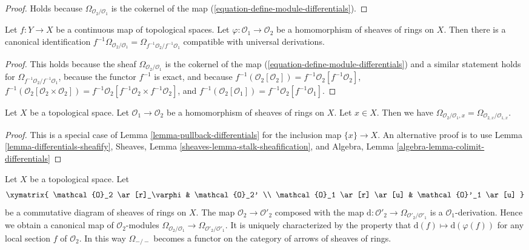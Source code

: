 \begin{proof}
Holds because $\Omega_{\mathcal{O}_2/\mathcal{O}_1}$
is the cokernel of the map (\ref{equation-define-module-differentials}).
\end{proof}

\begin{lemma}
\label{lemma-pullback-differentials}
Let $f : Y \to X$ be a continuous map of topological spaces.
Let $\varphi : \mathcal{O}_1 \to \mathcal{O}_2$
be a homomorphism of sheaves of rings on $X$.
Then there is a canonical identification
$f^{-1}\Omega_{\mathcal{O}_2/\mathcal{O}_1} =
\Omega_{f^{-1}\mathcal{O}_2/f^{-1}\mathcal{O}_1}$
compatible with universal derivations.
\end{lemma}

\begin{proof}
This holds because the sheaf $\Omega_{\mathcal{O}_2/\mathcal{O}_1}$
is the cokernel of the map (\ref{equation-define-module-differentials})
and a similar statement holds for
$\Omega_{f^{-1}\mathcal{O}_2/f^{-1}\mathcal{O}_1}$,
because the functor $f^{-1}$ is exact, and because
$f^{-1}(\mathcal{O}_2[\mathcal{O}_2]) =
f^{-1}\mathcal{O}_2[f^{-1}\mathcal{O}_2]$,
$f^{-1}(\mathcal{O}_2[\mathcal{O}_2 \times \mathcal{O}_2]) =
f^{-1}\mathcal{O}_2[f^{-1}\mathcal{O}_2 \times f^{-1}\mathcal{O}_2]$, and
$f^{-1}(\mathcal{O}_2[\mathcal{O}_1]) =
f^{-1}\mathcal{O}_2[f^{-1}\mathcal{O}_1]$.
\end{proof}

\begin{lemma}
\label{lemma-stalk-module-differentials}
Let $X$ be a topological space. Let $\mathcal{O}_1 \to \mathcal{O}_2$
be a homomorphism of sheaves of rings on $X$. Let $x \in X$. Then we have
$\Omega_{\mathcal{O}_2/\mathcal{O}_1, x} =
\Omega_{\mathcal{O}_{2, x}/\mathcal{O}_{1, x}}$.
\end{lemma}

\begin{proof}
This is a special case of Lemma \ref{lemma-pullback-differentials}
for the inclusion map $\{x\} \to X$. An alternative proof is to use
Lemma \ref{lemma-differentials-sheafify},
Sheaves, Lemma \ref{sheaves-lemma-stalk-sheafification}, and
Algebra, Lemma \ref{algebra-lemma-colimit-differentials}
\end{proof}

\begin{lemma}
\label{lemma-functoriality-differentials}
Let $X$ be a topological space. Let
$$
\xymatrix{
\mathcal{O}_2 \ar[r]_\varphi & \mathcal{O}_2' \\
\mathcal{O}_1 \ar[r] \ar[u] & \mathcal{O}'_1 \ar[u]
}
$$
be a commutative diagram of sheaves of rings on $X$. The map
$\mathcal{O}_2 \to \mathcal{O}'_2$ composed with the map
$\text{d} : \mathcal{O}'_2 \to \Omega_{\mathcal{O}'_2/\mathcal{O}'_1}$
is a $\mathcal{O}_1$-derivation. Hence we obtain a canonical map of
$\mathcal{O}_2$-modules
$\Omega_{\mathcal{O}_2/\mathcal{O}_1} \to
\Omega_{\mathcal{O}'_2/\mathcal{O}'_1}$.
It is uniquely characterized by the property that
$\text{d}(f) \mapsto \text{d}(\varphi(f))$
for any local section $f$ of $\mathcal{O}_2$.
In this way $\Omega_{-/-}$ becomes a functor on the category
of arrows of sheaves of rings.
\end{lemma}

